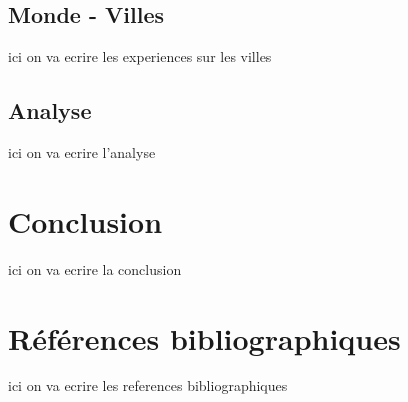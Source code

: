\documentclass {article}
\begin{document}
\subsection {Monde - Villes}\label{mondeVilles}
ici on va ecrire les experiences sur les villes

\subsection {Analyse}\label{analyse}
ici on va ecrire l'analyse

\section {Conclusion}
ici on va ecrire la conclusion

\section {Références bibliographiques}
ici on va ecrire les references bibliographiques
\end{document}
